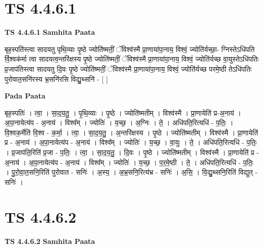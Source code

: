 \documentclass[17pt]{extarticle}
\begin{document}

\section{ TS 4.4.6.1 }

\textbf{TS 4.4.6.1 } \newline
\textbf{Samhita Paata} \newline

बृह॒स्पति॑स्त्वा सादयतु पृथि॒व्याः पृ॒ष्ठे ज्योति॑ष्मतीं॒ ॅविश्व॑स्मै प्रा॒णाया॑पा॒नाय॒ विश्वं॒ ज्योति॑र्यच्छा॒- ग्निस्तेऽधि॑पति र्वि॒श्वक॑र्मा त्वा सादयत्व॒न्तरि॑क्षस्य पृ॒ष्ठे ज्योति॑ष्मतीं॒ ॅविश्व॑स्मै प्रा॒णाया॑पा॒नाय॒ विश्वं॒ ज्योति॑र्यच्छ वा॒युस्तेऽधि॑पतिः प्र॒जाप॑तिस्त्वा सादयतु दि॒वः पृ॒ष्ठे ज्योति॑ष्मतीं॒ ॅविश्व॑स्मै प्रा॒णाया॑पा॒नाय॒ विश्वं॒ ज्योति॑र्यच्छ परमे॒ष्ठी तेऽधि॑पतिः पुरोवात॒सनि॑रस्य भ्र॒सनि॑रसि विद्यु॒थ्सनि॑ - [  ] \newline

\textbf{Pada Paata} \newline

बृह॒स्पतिः॑ । त्वा॒ । सा॒द॒य॒तु॒ । पृ॒थि॒व्याः । पृ॒ष्ठे । ज्योति॑ष्मतीम् । विश्व॑स्मै । प्रा॒णायेति॑ प्र-अ॒नाय॑ । अ॒पा॒नायेत्य॑प - अ॒नाय॑ । विश्व᳚म् । ज्योतिः॑ । य॒च्छ॒ । अ॒ग्निः । ते॒ । अधि॑पति॒रित्यधि॑ - प॒तिः॒ । वि॒श्वक॒र्मेति॑ वि॒श्व - क॒र्मा॒ । त्वा॒ । सा॒द॒य॒तु॒ । अ॒न्तरि॑क्षस्य । पृ॒ष्ठे । ज्योति॑ष्मतीम् । विश्व॑स्मै । प्रा॒णायेति॑ प्र - अ॒नाय॑ । अ॒पा॒नायेत्य॑प - अ॒नाय॑ । विश्व᳚म् । ज्योतिः॑ । य॒च्छ॒ । वा॒युः । ते॒ । अधि॑पति॒रित्यधि॑ - प॒तिः॒ । प्र॒जाप॑ति॒रिति॑ प्र॒जा - प॒तिः॒ । त्वा॒ । सा॒द॒य॒तु॒ । दि॒वः । पृ॒ष्ठे । ज्योति॑ष्मतीम् । विश्व॑स्मै । प्रा॒णायेति॑ प्र - अ॒नाय॑ । अ॒पा॒नायेत्य॑प - अ॒नाय॑ । विश्व᳚म् । ज्योतिः॑ । य॒च्छ॒ । प॒र॒मे॒ष्ठी । ते॒ । अधि॑पति॒रित्यधि॑ - प॒तिः॒ । पु॒रो॒वा॒त॒सनि॒रिति॑ पुरोवात - सनिः॑ । अ॒स्य॒ । अ॒भ्र॒सनि॒रित्य॑भ्र - सनिः॑ । अ॒सि॒ । वि॒द्यु॒थ्सनि॒रिति॑ विद्युत् - सनिः॑ ।  \newline





\section{ TS 4.4.6.2 }

\textbf{TS 4.4.6.2 } \newline
\textbf{Samhita Paata} \newline
\end{document}
